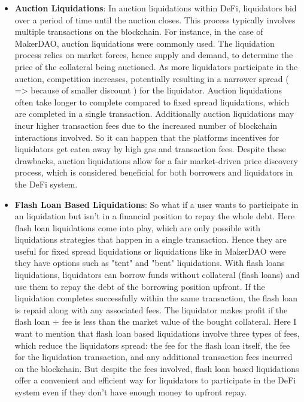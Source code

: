 \documentclass{article}
\begin{document}
\begin{itemize}
\item \textbf{Auction Liquidations}:
In auction liquidations within DeFi, liquidators bid over a period of time  until the auction closes. This process typically involves multiple transactions on the blockchain. For instance, in the case of MakerDAO, auction liquidations were commonly used. The liquidation process relies on market forces, hence supply and demand, to determine the price of the collateral being auctioned. As more liquidators participate in the auction, competition increases, potentially resulting in a narrower spread ( => because of smaller discount ) for the liquidator. Auction liquidations often take longer to complete compared to fixed spread liquidations, which are completed in a single transaction. Additionally auction liquidations may incur higher transaction fees due to the increased number of blockchain interactions involved. So it can happen that the platforms incentives for liquidators get eaten away by high gas and transaction fees. Despite these drawbacks, auction liquidations allow for a fair market-driven price discovery process, which is considered beneficial for both borrowers and liquidators in the DeFi system.

\item \textbf{Flash Loan Based Liquidations}: So what if a user wants to participate in an liquidation but isn't in a financial position to repay the whole debt. Here flash loan liquidations come into play, which are only possible with liquidations strategies that happen in a single transaction. Hence they are useful for fixed spread liquidations or liquidations like in MakerDAO were they have options such as "tent" and "bent" liquidations. With flash loans liquidations, liquidators can borrow funds without collateral (flash loans) and use them to repay the debt of the borrowing position upfront. If the liquidation completes successfully within the same transaction, the flash loan is repaid along with any associated fees. The liquidator makes profit if the flash loan + fee is less than the market value of the bought collateral. Here I want to mention that flash loan based liquidations involve three types of fees, which reduce the liquidators spread: the fee for the flash loan itself, the fee for the liquidation transaction, and any additional transaction fees incurred on the blockchain. But despite the fees involved, flash loan based liquidations offer a convenient and efficient way for liquidators to participate in the DeFi system even if they don't have enough money to upfront repay.

\end{itemize}
\end{document}
